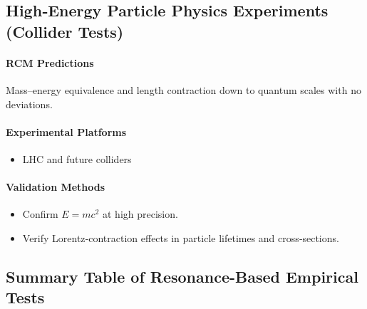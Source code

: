 \subsection{High‐Energy Particle Physics Experiments (Collider Tests)}

\paragraph{RCM Predictions}
Mass–energy equivalence and length contraction down to quantum scales with no deviations.

\paragraph{Experimental Platforms}
\begin{itemize}
  \item LHC and future colliders  
\end{itemize}

\paragraph{Validation Methods}
\begin{itemize}
  \item Confirm $E=mc^2$ at high precision.  
  \item Verify Lorentz‐contraction effects in particle lifetimes and cross‐sections.
\end{itemize}

\subsection{Summary Table of Resonance-Based Empirical Tests}

